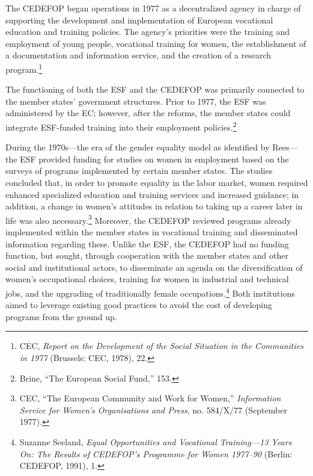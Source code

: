 \documentclass{tufte-handout}
\begin{document}
The CEDEFOP began operations in 1977 as a decentralized agency in charge
of supporting the development and implementation of European vocational
education and training policies. The agency's priorities were the
training and employment of young people, vocational training for women,
the establishment of a documentation and information service, and the
creation of a research program.\footnote{CEC, \emph{Report on the
  Development of the Social Situation in the Communities in 1977}
  (Brussels: CEC, 1978), 22.}

The functioning of both the ESF and the CEDEFOP was primarily connected
to the member states' government structures. Prior to 1977, the ESF was
administered by the EC; however, after the reforms, the member states
could integrate ESF-funded training into their employment
policies.\footnote{Brine, ``The European Social Fund,'' 153.}

During the 1970s---the era of the gender equality model as identified by
Rees---the ESF provided funding for studies on women in employment based
on the surveys of programs implemented by certain member states. The
studies concluded that, in order to promote equality in the labor
market, women required enhanced specialized education and training
services and increased guidance; in addition, a change in women's
attitudes in relation to taking up a career later in life was also
necessary.\footnote{CEC, ``The European Community and Work for Women,''
  \emph{Information Service for Women's Organisations and Press}, no.
  584/X/77 (September 1977).} Moreover, the CEDEFOP reviewed programs
already implemented within the member states in vocational training and
disseminated information regarding these. Unlike the ESF, the CEDEFOP
had no funding function, but sought, through cooperation with the member
states and other social and institutional actors, to disseminate an
agenda on the diversification of women's occupational choices, training
for women in industrial and technical jobs, and the upgrading of
traditionally female occupations.\footnote{Suzanne Seeland, \emph{Equal
  Opportunities and Vocational Training---13 Years On: The Results of
  CEDEFOP's Programme for Women 1977--90} (Berlin: CEDEFOP, 1991), 1.}
Both institutions aimed to leverage existing good practices to avoid the
cost of developing programs from the ground up.
\end{document}

